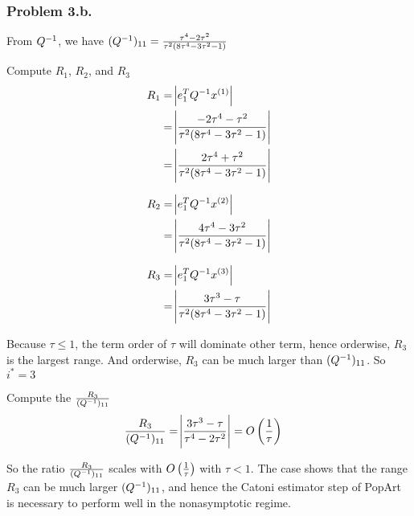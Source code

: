 \subsubsection*{Problem 3.b.}

From $Q^{-1}$, we have $(Q^{-1})_{11} = \frac{\tau^4 - 2\tau^2}{\tau^2(8\tau^4 - 3\tau^2 -1)} $

Compute $R_1$, $R_2$, and $R_3$
\begin{align*}
  R_1 &= \abs{e_1^TQ^{-1} x^{(1)}} \\
      &= \abs{\frac{-2\tau^4 - \tau^2}{\tau^2(8\tau^4 - 3\tau^2 -1)}} \\
      &= \abs{\frac{2\tau^4 + \tau^2}{\tau^2(8\tau^4 - 3\tau^2 -1)}}
\end{align*}

\begin{align*}
  R_2 &= \abs{e_1^TQ^{-1} x^{(2)}} \\
      &= \abs{\frac{4\tau^4 - 3\tau^2}{\tau^2(8\tau^4 - 3\tau^2 -1)}} 
\end{align*}

\begin{align*}
  R_3 &= \abs{e_1^TQ^{-1} x^{(3)}} \\
      &= \abs{\frac{3\tau^3 - \tau}{\tau^2(8\tau^4 - 3\tau^2 -1)}} 
\end{align*}

Because $\tau \le 1$, the term order of $\tau$ will dominate other term, hence orderwise, $R_3$ is the largest range. And orderwise, $R_3$ can be much larger than $(Q^{-1})_{11}$. So $i^* = 3$

Compute the $\frac{R_3}{(Q^{-1})_{11}}$
\begin{align*}
  \frac{R_3}{(\Qinv)_{11}} & = \abs{\frac{3\tau^3 - \tau}{\tau^4 - 2\tau^2}} = O\del{\frac{1}{\tau}}
\end{align*}

So the ratio $\frac{R_3}{(Q^{-1})_{11}}$ scales with $O\del{\frac{1}{\tau}}$ with $\tau < 1$. The case shows that the range $R_3$ can be much larger $(Q^{-1})_{11}$, and hence the Catoni estimator step of PopArt is necessary to perform well in the nonasymptotic regime.